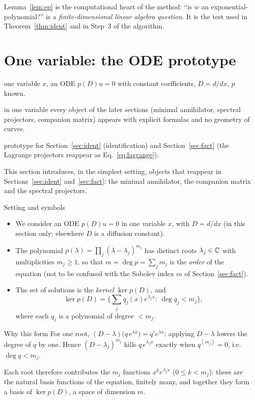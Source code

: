 \documentclass[11pt,a4paper]{article}
\theoremstyle{definition}
\newcommand{\sectionbrief}[3]{\begin{leadin}\begin{description}[nosep,leftmargin=3.0cm,labelwidth=2.8cm]
  \item[Starting from] #1
  \item[Why this section] #2
  \item[Role in the paper] #3
  \end{description}\end{leadin}}
\begin{document}
\begin{takeaway}
Lemma~\ref{lem:ep} is the computational heart of the method: ``is $w$ an exponential-polynomial?'' is a \emph{finite-dimensional linear algebra question}. It is the test used in Theorem~\ref{thm:ident} and in Step~3 of the algorithm.
\end{takeaway}

\section{One variable: the ODE prototype}\label{sec:ode}
\sectionbrief
{one variable $x$, an ODE $p(D)u=0$ with constant coefficients, $D=d/dx$, $p$ known.}
{in one variable every object of the later sections (minimal annihilator, spectral projectors, companion matrix) appears with explicit formulas and no geometry of curves.}
{prototype for Section~\ref{sec:ident} (identification) and Section~\ref{sec:fact} (the Lagrange projectors reappear as Eq.~\eqref{eq:lagrange}).}
This section introduces, in the simplest setting, objects that reappear in Sections~\ref{sec:ident} and~\ref{sec:fact}: the minimal annihilator, the companion matrix and the spectral projectors.

\begin{notebox}{Setting and symbols}
\begin{itemize}[nosep]
\item We consider an ODE $p(D)u=0$ in one variable $x$, with $D=d/dx$ (in this section only; elsewhere $D$ is a diffusion constant).
\item The polynomial $p(\lambda)=\prod_j(\lambda-\lambda_j)^{m_j}$ has distinct roots $\lambda_j\in\mathbb{C}$ with multiplicities $m_j\ge1$, so that $m=\deg p=\sum_jm_j$ is the \emph{order} of the equation (not to be confused with the Sobolev index $m$ of Section~\ref{sec:fact}).
\item The set of solutions is the \emph{kernel} $\ker p(D)$, and
\[
\ker p(D)=\Big\{\sum_jq_j(x)e^{\lambda_jx}:\ \deg q_j<m_j\Big\},
\]
where each $q_j$ is a polynomial of degree $<m_j$.
\end{itemize}
\end{notebox}

\begin{aside}{Why this form}
For one root, $(D-\lambda)\big(q\,e^{\lambda x}\big)=q'e^{\lambda x}$: applying $D-\lambda$ lowers the degree of $q$ by one. Hence $(D-\lambda_j)^{m_j}$ kills $q\,e^{\lambda_jx}$ exactly when $q^{(m_j)}=0$, i.e.\ $\deg q<m_j$.

Each root therefore contributes the $m_j$ functions $x^ke^{\lambda_jx}$ ($0\le k<m_j$): these are the natural basis functions of the equation, finitely many, and together they form a basis of $\ker p(D)$, a space of dimension $m$.
\end{aside}
\end{document}
